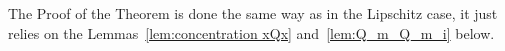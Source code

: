 \documentclass[a4papaer, titlepage]{book}
\begin{document}
The Proof of the Theorem is done the same way as in the Lipschitz case, it just relies on the Lemmas~\ref{lem:concentration xQx} and~\ref{lem:Q_m_Q_m_i} below.
\end{document}
